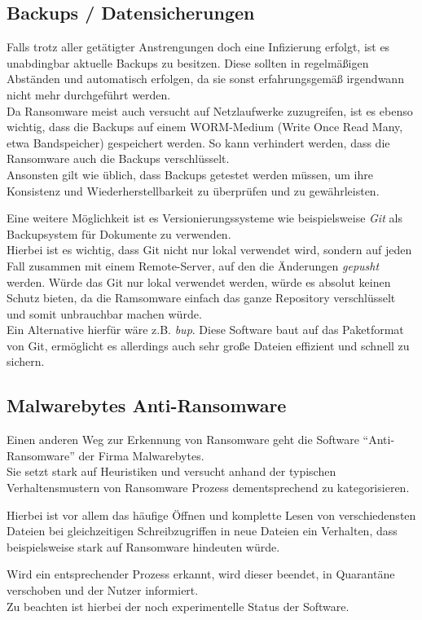 \subsection{Backups / Datensicherungen}

Falls trotz aller getätigter Anstrengungen doch eine Infizierung erfolgt, ist es unabdingbar aktuelle Backups zu besitzen. Diese sollten in regelmäßigen Abständen und automatisch erfolgen, da sie sonst erfahrungsgemäß irgendwann nicht mehr durchgeführt werden. \\
Da Ransomware meist auch versucht auf Netzlaufwerke zuzugreifen, ist es ebenso wichtig, dass die Backups auf einem WORM-Medium (Write Once Read Many, etwa Bandspeicher)  gespeichert werden. So kann verhindert werden, dass die Ransomware auch die Backups verschlüsselt. \\
Ansonsten gilt wie üblich, dass Backups getestet werden müssen, um ihre Konsistenz und Wiederherstellbarkeit zu überprüfen und zu gewährleisten.

Eine weitere Möglichkeit ist es Versionierungssysteme wie beispielsweise \textit{Git} als Backupsystem für Dokumente zu verwenden. \\
Hierbei ist es wichtig, dass Git nicht nur lokal verwendet wird, sondern auf jeden Fall zusammen mit einem Remote-Server, auf den die Änderungen \textit{gepusht} werden. Würde das Git nur lokal verwendet werden, würde es absolut keinen Schutz bieten, da die Ramsomware einfach das ganze Repository verschlüsselt und somit unbrauchbar machen würde.\\
Ein Alternative hierfür wäre z.B. \textit{bup}. Diese Software baut auf das Paketformat von Git, ermöglicht es allerdings auch sehr große Dateien effizient und schnell zu sichern. \cite{bup}
	
	
	
\subsection{Malwarebytes Anti-Ransomware}
Einen anderen Weg zur Erkennung von Ransomware geht die Software "`Anti-Ransomware"' der Firma Malwarebytes. \cite{malwarebytes} \\
Sie setzt stark auf Heuristiken und versucht anhand der typischen Verhaltensmustern von Ransomware Prozess dementsprechend zu kategorisieren. 

Hierbei ist vor allem das häufige Öffnen und komplette Lesen von verschiedensten Dateien bei gleichzeitigen Schreibzugriffen in neue Dateien ein Verhalten, dass beispielsweise stark auf Ransomware hindeuten würde.

Wird ein entsprechender Prozess erkannt, wird dieser beendet, in Quarantäne verschoben und der Nutzer informiert.\\
Zu beachten ist hierbei der noch experimentelle Status der Software.

